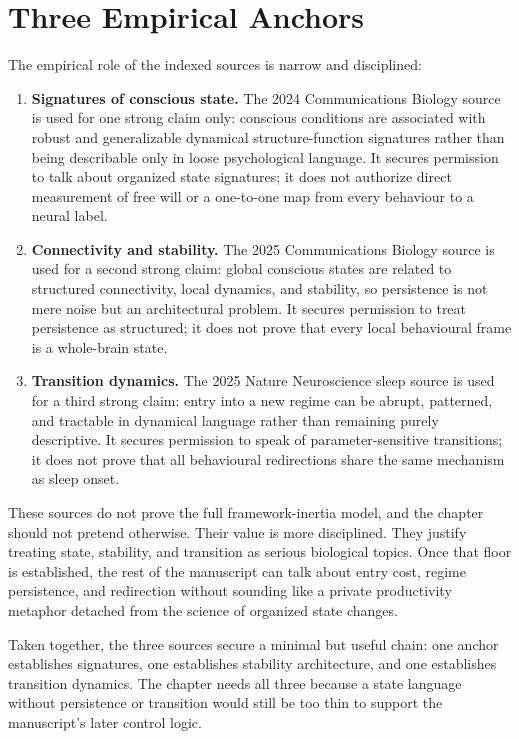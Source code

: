 \section{Three Empirical Anchors}

The empirical role of the indexed sources is narrow and disciplined:
\begin{enumerate}[nosep]
  \item \textbf{Signatures of conscious state.} The 2024 Communications
        Biology source is used for one strong claim only: conscious conditions
        are associated with robust and generalizable dynamical
        structure-function signatures rather than being describable only in
        loose psychological language. It secures permission to talk about
        organized state signatures; it does not authorize direct measurement of
        free will or a one-to-one map from every behaviour to a neural label.
  \item \textbf{Connectivity and stability.} The 2025 Communications Biology
        source is used for a second strong claim: global conscious states are
        related to structured connectivity, local dynamics, and stability, so
        persistence is not mere noise but an architectural problem. It secures
        permission to treat persistence as structured; it does not prove that
        every local behavioural frame is a whole-brain state.
  \item \textbf{Transition dynamics.} The 2025 Nature Neuroscience sleep
        source is used for a third strong claim: entry into a new regime can
        be abrupt, patterned, and tractable in dynamical language rather than
        remaining purely descriptive. It secures permission to speak of
        parameter-sensitive transitions; it does not prove that all behavioural
        redirections share the same mechanism as sleep onset.
\end{enumerate}

\begin{discussion}
These sources do not prove the full framework-inertia model, and the chapter
should not pretend otherwise. Their value is more disciplined. They justify
treating state, stability, and transition as serious biological topics. Once
that floor is established, the rest of the manuscript can talk about entry
cost, regime persistence, and redirection without sounding like a private
productivity metaphor detached from the science of organized state changes.
\end{discussion}

\begin{remark}
Taken together, the three sources secure a minimal but useful chain: one anchor
establishes signatures, one establishes stability architecture, and one
establishes transition dynamics. The chapter needs all three because a state
language without persistence or transition would still be too thin to support
the manuscript's later control logic.
\end{remark}
